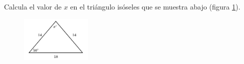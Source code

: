 \question[15]  Calcula el valor de $x$ en el triángulo isóseles  que se muestra abajo (figura \ref{fig:findangle01}).
\begin{figure}[H]
    \begin{center}
        \includegraphics[width=0.3\textwidth]{../images/findangle01.png}
    \end{center}
    \caption{}
    \label{fig:findangle01}
\end{figure}
